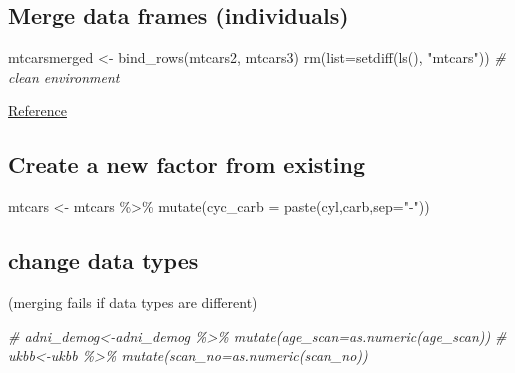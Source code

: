\documentclass[
]{article}
\newenvironment{Shaded}{\begin{snugshade}}{\end{snugshade}}
\newcommand{\AttributeTok}[1]{\textcolor[rgb]{0.77,0.63,0.00}{#1}}
\newcommand{\CommentTok}[1]{\textcolor[rgb]{0.56,0.35,0.01}{\textit{#1}}}
\newcommand{\FunctionTok}[1]{\textcolor[rgb]{0.00,0.00,0.00}{#1}}
\newcommand{\NormalTok}[1]{#1}
\newcommand{\OtherTok}[1]{\textcolor[rgb]{0.56,0.35,0.01}{#1}}
\newcommand{\SpecialCharTok}[1]{\textcolor[rgb]{0.00,0.00,0.00}{#1}}
\newcommand{\StringTok}[1]{\textcolor[rgb]{0.31,0.60,0.02}{#1}}
\begin{document}
\hypertarget{merge-data-frames-individuals}{%
\subsection{Merge data frames (individuals)}\label{merge-data-frames-individuals}}

\begin{Shaded}
\begin{Highlighting}[]
\NormalTok{mtcarsmerged }\OtherTok{\textless{}{-}} \FunctionTok{bind\_rows}\NormalTok{(mtcars2, mtcars3)}
\FunctionTok{rm}\NormalTok{(}\AttributeTok{list=}\FunctionTok{setdiff}\NormalTok{(}\FunctionTok{ls}\NormalTok{(), }\StringTok{"mtcars"}\NormalTok{)) }\CommentTok{\# clean environment}
\end{Highlighting}
\end{Shaded}

\href{https://dplyr.tidyverse.org/reference/bind.html}{Reference}

\hypertarget{create-a-new-factor-from-existing}{%
\subsection{Create a new factor from existing}\label{create-a-new-factor-from-existing}}

\begin{Shaded}
\begin{Highlighting}[]
\NormalTok{mtcars }\OtherTok{\textless{}{-}}\NormalTok{ mtcars }\SpecialCharTok{\%\textgreater{}\%} \FunctionTok{mutate}\NormalTok{(}\AttributeTok{cyc\_carb =} \FunctionTok{paste}\NormalTok{(cyl,carb,}\AttributeTok{sep=}\StringTok{"{-}"}\NormalTok{))}
\end{Highlighting}
\end{Shaded}

\hypertarget{change-data-types}{%
\subsection{change data types}\label{change-data-types}}

(merging fails if data types are different)

\begin{Shaded}
\begin{Highlighting}[]
\CommentTok{\# adni\_demog\textless{}{-}adni\_demog \%\textgreater{}\% mutate(age\_scan=as.numeric(age\_scan))}
\CommentTok{\# ukbb\textless{}{-}ukbb \%\textgreater{}\% mutate(scan\_no=as.numeric(scan\_no))}
\end{Highlighting}
\end{Shaded}
\end{document}
